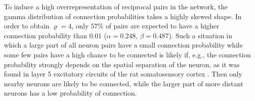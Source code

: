 




To induce a high overrepresentation of reciprocal pairs in the
network, the gamma distribution of connection probabilities takes a
highly skewed shape. In order to obtain $\varrho = 4$, only $57\%$ of
pairs are expected to have a higher connection probability than $0.01$
($\alpha=0.248$, $\beta = 0.487$). Such a situation in which a large
part of all neuron pairs have a small connection probability while
some few pairs have a high chance to be connected is likely if, e.g.,
the connection probability strongly depends on the spatial separation
of the neuron, as it was found in layer 5 excitatory circuits of the
rat somatosensory cortex \cite{Perin2011}. Then only nearby neurons
are likely to be connected, while the larger part of more distant
neurons has a low probability of connection.
